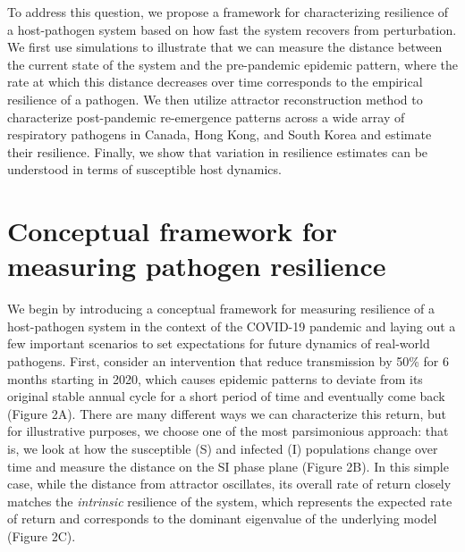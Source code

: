 \documentclass[12pt]{article}
\begin{document}
To address this question, we propose a framework for characterizing resilience of a host-pathogen system based on how fast the system recovers from perturbation.
We first use simulations to illustrate that we can measure the distance between the current state of the system and the pre-pandemic epidemic pattern, where the rate at which this distance decreases over time corresponds to the empirical resilience of a pathogen.
We then utilize attractor reconstruction method to characterize post-pandemic re-emergence patterns across a wide array of respiratory pathogens in Canada, Hong Kong, and South Korea and estimate their resilience. 
Finally, we show that variation in resilience estimates can be understood in terms of susceptible host dynamics.
 
\section*{Conceptual framework for measuring pathogen resilience}

We begin by introducing a conceptual framework for measuring resilience of a host-pathogen system in the context of the COVID-19 pandemic and laying out a few important scenarios to set expectations for future dynamics of real-world pathogens.
First, consider an intervention that reduce transmission by 50\% for 6 months starting in 2020, which causes epidemic patterns to deviate from its original stable annual cycle for a short period of time and eventually come back (Figure 2A).
There are many different ways we can characterize this return, but for illustrative purposes, we choose one of the most parsimonious approach: that is, we look at how the susceptible (S) and infected (I) populations change over time and measure the distance on the SI phase plane (Figure 2B).
In this simple case, while the distance from attractor oscillates, its overall rate of return closely matches the \emph{intrinsic} resilience of the system, which represents the expected rate of return and corresponds to the dominant eigenvalue of the underlying model (Figure 2C).
\end{document}
